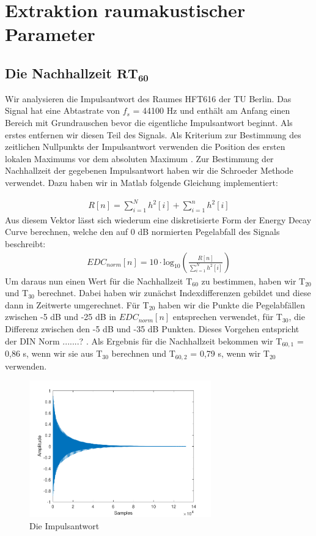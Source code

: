 \chapter{Extraktion raumakustischer Parameter}
\section{Die Nachhallzeit $\mathbf{RT_{60}}$}
\label{sec:rt60}Wir analysieren die Impulsantwort des Raumes HFT616 der TU Berlin.
Das Signal hat eine Abtastrate von $f_s$ = 44100 Hz und enthält am Anfang einen Bereich mit Grundrauschen bevor die eigentliche Impulsantwort beginnt.
Als erstes entfernen wir diesen Teil des Signals.
Als Kriterium zur Bestimmung des zeitlichen Nullpunkts der Impulsantwort verwenden die Position des ersten lokalen Maximums vor dem absoluten Maximum .
Zur Bestimmung der Nachhallzeit der gegebenen Impulsantwort haben wir die Schroeder Methode \cite{Schroeder65} verwendet.
Dazu haben wir in Matlab folgende Gleichung implementiert:

\begin{align*}
R[n] = \sum_{i=1}^N h^2[i] + \sum_{i=1}^n h^2[i]
\end{align*}
Aus diesem Vektor lässt sich wiederum eine diskretisierte Form der Energy Decay Curve berechnen, welche den auf 0 dB normierten Pegelabfall des Signals  beschreibt:
\begin{align*}
EDC_{norm}[n] = 10 \cdot \mathrm{log}_{10} \left(\frac{R[n]}{\sum_{i=1}^N h^2[i]}\right)
\end{align*}
Um daraus nun einen Wert für die Nachhallzeit T$_{60}$ zu bestimmen, haben wir T$_{20}$ und T$_{30}$ berechnet.
Dabei haben wir zunächst Indexdifferenzen gebildet und diese dann in Zeitwerte umgerechnet.
Für T$_{20}$ haben wir die Punkte die Pegelabfällen zwischen -5 dB und -25 dB in $EDC_{norm}[n]$ entsprechen verwendet, für T$_{30}$, die Differenz zwischen den -5 dB und -35 dB Punkten.
Dieses Vorgehen entspricht der DIN Norm .......? .
Als Ergebnis für die Nachhallzeit bekommen wir T$_{60,1}$ = 0,86 s, wenn wir sie aus T$_{30}$ berechnen und T$_{60,2}$ = 0,79 s, wenn wir T$_{20}$ verwenden.




\begin{figure}[H]
    \center
    \includegraphics[width = 0.7\textwidth]{figures/samples}
    \caption{Die Impulsantwort}
    \label{fig:im}
\end{figure}

